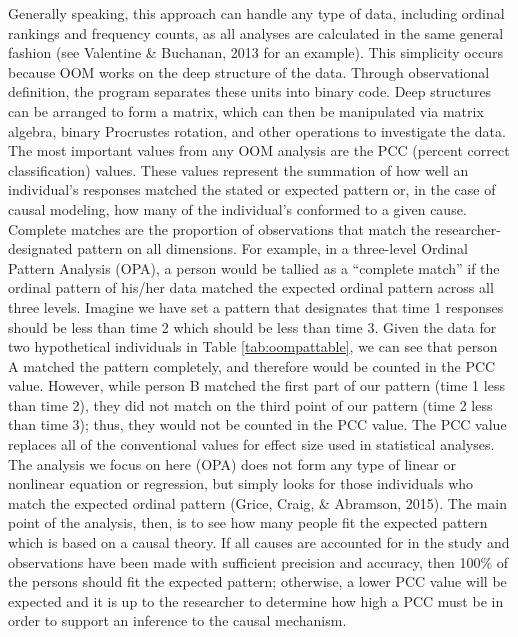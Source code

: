 \documentclass[english,man]{apa6}
\theoremstyle{definition}
\theoremstyle{definition}
\theoremstyle{definition}
\theoremstyle{remark}
\begin{document}
Generally speaking, this approach can handle any type of data, including
ordinal rankings and frequency counts, as all analyses are calculated in
the same general fashion (see Valentine \& Buchanan, 2013 for an
example). This simplicity occurs because OOM works on the deep structure
of the data. Through observational definition, the program separates
these units into binary code. Deep structures can be arranged to form a
matrix, which can then be manipulated via matrix algebra, binary
Procrustes rotation, and other operations to investigate the data. The
most important values from any OOM analysis are the PCC (percent correct
classification) values. These values represent the summation of how well
an individual's responses matched the stated or expected pattern or, in
the case of causal modeling, how many of the individual's conformed to a
given cause. Complete matches are the proportion of observations that
match the researcher-designated pattern on all dimensions. For example,
in a three-level Ordinal Pattern Analysis (OPA), a person would be
tallied as a \enquote{complete match} if the ordinal pattern of his/her
data matched the expected ordinal pattern across all three levels.
Imagine we have set a pattern that designates that time 1 responses
should be less than time 2 which should be less than time 3. Given the
data for two hypothetical individuals in Table \ref{tab:oompattable}, we
can see that person A matched the pattern completely, and therefore
would be counted in the PCC value. However, while person B matched the
first part of our pattern (time 1 less than time 2), they did not match
on the third point of our pattern (time 2 less than time 3); thus, they
would not be counted in the PCC value. The PCC value replaces all of the
conventional values for effect size used in statistical analyses. The
analysis we focus on here (OPA) does not form any type of linear or
nonlinear equation or regression, but simply looks for those individuals
who match the expected ordinal pattern (Grice, Craig, \& Abramson,
2015). The main point of the analysis, then, is to see how many people
fit the expected pattern which is based on a causal theory. If all
causes are accounted for in the study and observations have been made
with sufficient precision and accuracy, then 100\% of the persons should
fit the expected pattern; otherwise, a lower PCC value will be expected
and it is up to the researcher to determine how high a PCC must be in
order to support an inference to the causal mechanism.
\end{document}
